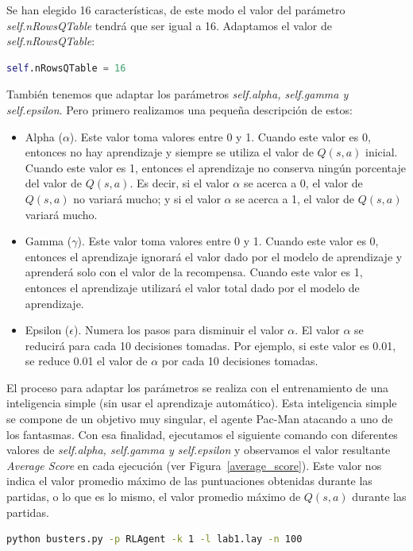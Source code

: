 \documentclass[11pt]{exam}
\begin{document}
Se han elegido 16 características, de este modo el valor del parámetro \textit{self.nRowsQTable} tendrá que ser igual a 16. Adaptamos el valor de \textit{self.nRowsQTable}:

\begin{lstlisting}[language=python, basicstyle=\footnotesize]
self.nRowsQTable = 16
\end{lstlisting}

También tenemos que adaptar los parámetros \textit{self.alpha, self.gamma y self.epsilon}. Pero primero realizamos una pequeña descripción de estos:

\begin{itemize}
	\item Alpha ($\alpha$). Este valor toma valores entre 0 y 1. Cuando este valor es 0, entonces no hay aprendizaje y siempre se utiliza el valor de $Q(s,a)$ inicial. Cuando este valor es 1, entonces el aprendizaje no conserva ningún porcentaje del valor de $Q(s,a)$. Es decir, si el valor $\alpha$ se acerca a 0, el valor de $Q(s,a)$ no variará mucho; y si el valor $\alpha$ se acerca a 1, el valor de $Q(s,a)$ variará mucho.
	\item Gamma ($\gamma$). Este valor toma valores entre 0 y 1. Cuando este valor es 0, entonces el aprendizaje ignorará el valor dado por el modelo de aprendizaje y aprenderá solo con el valor de la recompensa. Cuando este valor es 1, entonces el aprendizaje utilizará el valor total dado por el modelo de aprendizaje.
	\item Epsilon ($\epsilon$). Numera los pasos para disminuir el valor $\alpha$. El valor $\alpha$ se reducirá para cada 10 decisiones tomadas. Por ejemplo, si este valor es 0.01, se reduce 0.01 el valor de $\alpha$ por cada 10 decisiones tomadas.
\end{itemize}

El proceso para adaptar los parámetros se realiza con el entrenamiento de una inteligencia simple (sin usar el aprendizaje automático). Esta inteligencia simple se compone de un objetivo muy singular, el agente Pac-Man atacando a uno de los fantasmas. Con esa finalidad, ejecutamos el siguiente comando con diferentes valores de \textit{self.alpha, self.gamma y self.epsilon} y observamos el valor resultante \textit{Average Score} en cada ejecución (ver Figura~\ref{average_score}). Este valor nos indica el valor promedio máximo de las puntuaciones obtenidas durante las partidas, o lo que es lo mismo, el valor promedio máximo de $Q(s,a)$ durante las partidas.

\begin{lstlisting}[language=bash, basicstyle=\footnotesize]
python busters.py -p RLAgent -k 1 -l lab1.lay -n 100
\end{lstlisting}
\end{document}
